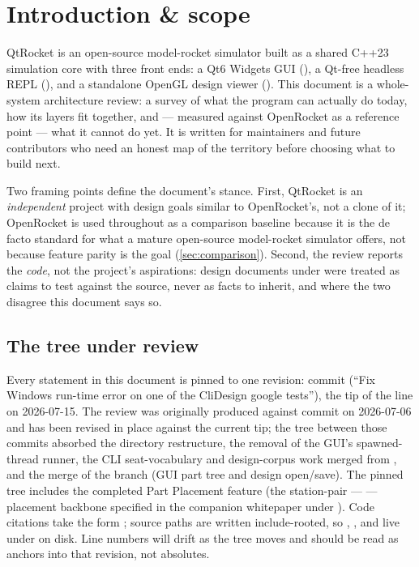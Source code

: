 \section{Introduction \& scope}\label{sec:intro}

QtRocket is an open-source model-rocket simulator built as a shared C++23 simulation core
with three front ends: a Qt6 Widgets GUI (), a Qt-free headless REPL
(), and a standalone OpenGL design viewer ().
This document is a whole-system architecture review: a survey of what the program can
actually do today, how its layers fit together, and --- measured against OpenRocket as a
reference point --- what it cannot do yet. It is written for maintainers and future
contributors who need an honest map of the territory before choosing what to build next.

Two framing points define the document's stance. First, QtRocket is an \emph{independent}
project with design goals similar to OpenRocket's, not a clone of it; OpenRocket is used
throughout as a comparison baseline because it is the de facto standard for what a mature
open-source model-rocket simulator offers, not because feature parity is the goal
(\cref{sec:comparison}). Second, the review reports the \emph{code}, not the project's
aspirations: design documents under  were treated as claims to test against
the source, never as facts to inherit, and where the two disagree this document says so.

\subsection{The tree under review}

Every statement in this document is pinned to one revision: commit 
(``Fix Windows run-time error on one of the CliDesign google tests''), the tip of the
 line on 2026-07-15. The review was originally produced against commit
 on 2026-07-06 and has been revised in place against the current tip; the
tree between those commits absorbed the  directory restructure, the removal
of the GUI's spawned-thread runner, the CLI seat-vocabulary and design-corpus work merged
from , and the merge of the  branch
(GUI part tree and design open/save). The pinned tree includes the completed Part
Placement feature (the station-pair ---  --- placement backbone
specified in the companion whitepaper under ).
Code citations take the form ; source paths are written
include-rooted, so , , and  live under 
on disk. Line numbers will drift as the tree moves and should be read as anchors into
that revision, not absolutes.

